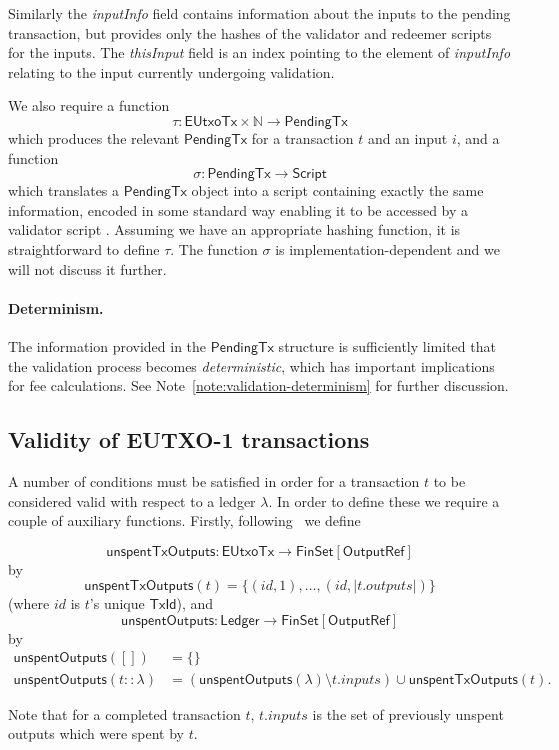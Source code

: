\documentclass[a4paper]{article}
\newcounter{note}
\renewcommand{\i}{\textit}  %
\newcommand{\s}{\textsf}  %
\newcommand{\FinSet}[1]{\ensuremath{\s{FinSet}[#1]}}
\newcommand{\script}{\ensuremath{\s{Script}}}
\newcommand{\ptx}{\ensuremath{\s{PendingTx}}}
\newcommand{\mi}[1]{\ensuremath{\mathit{#1}}}
\newcommand{\inputs}{\mi{inputs}}
\newcommand{\msf}[1]{\ensuremath{\mathsf{#1}}}
\newcommand{\unspent}{\msf{unspentOutputs}}
\newcommand{\txunspent}{\msf{unspentTxOutputs}}
\newcommand{\eutxotx}{\msf{EUtxoTx}}
\newcommand\N{\ensuremath{\mathbb{N}}}
\newcommand{\emptymap}{\ensuremath{\{\}}}
\begin{document}
Similarly the \i{inputInfo} field contains information about the
inputs to the pending transaction, but provides only the hashes of the
validator and redeemer scripts for the inputs.  The \i{thisInput}
field is an index pointing to the element of \i{inputInfo}
relating to the input currently undergoing validation.

\medskip
\noindent We also require a function
$$
\tau: \eutxotx \times \N \rightarrow \ptx
$$
which produces the relevant $\ptx$ for a transaction $t$ and an input
$i$, and a function
$$
\sigma: \ptx \rightarrow \script
$$
which translates a $\ptx$ object into a script containing exactly the
same information, encoded in some standard way enabling it to be accessed
by a validator script .  Assuming we have an appropriate hashing
function, it is straightforward to define $\tau$.  The function
$\sigma$ is implementation-dependent and we will not discuss it
further.

\paragraph{Determinism.}  The information provided in the $\ptx$
structure is sufficiently limited that the validation process
becomes \textit{deterministic},  which has important implications
for fee calculations.  See Note~\ref{note:validation-determinism}
for further discussion.


\subsection{Validity of EUTXO-1 transactions}
\label{sec:eutxo-1-validity}
A number of conditions must be satisfied in order for a transaction
$t$ to be considered valid with respect to a ledger $\lambda$.  In
order to define these we require a couple of auxiliary functions.
Firstly, following~\citep{Zahnentferner18-UTxO} we define

$$
  \txunspent : \eutxotx \rightarrow \FinSet{\s{OutputRef}}
  $$
% 
  by
% 
$$
\txunspent(t) = \{(id,1), \ldots, (\mathit{id},\left|t.outputs\right|)\}
$$
\noindent (where $\mathit{id}$ is $t$'s unique $\s{TxId}$), and
%
\[
  \unspent : \mathsf{Ledger} \rightarrow \FinSet{\s{OutputRef}}
\]
%
by
% 
\begin{align*}
   \unspent([]) &=\emptymap \\
   \unspent(t::\lambda) &= (\unspent(\lambda) \setminus t.\inputs) \cup \txunspent(t).
\end{align*}

\noindent Note that for a completed transaction $t$, $t.\inputs$ is
the set of previously unspent outputs which were spent by $t$.
\end{document}
